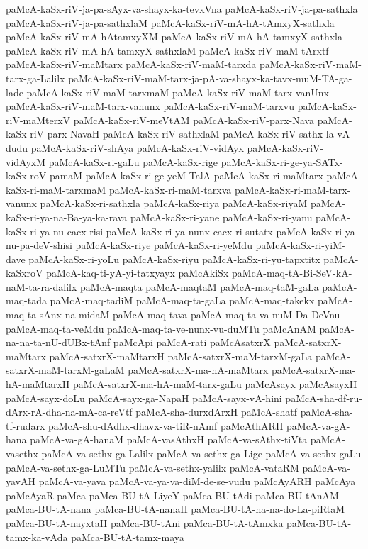 {paMcA-kaSx-riV-ja-pa-sAyx-va-shayx-ka-tevxVna
paMcA-kaSx-riV-ja-pa-sathxla
paMcA-kaSx-riV-ja-pa-sathxlaM
paMcA-kaSx-riV-mA-hA-tAmxyX-sathxla
paMcA-kaSx-riV-mA-hAtamxyXM
paMcA-kaSx-riV-mA-hA-tamxyX-sathxla
paMcA-kaSx-riV-mA-hA-tamxyX-sathxlaM
paMcA-kaSx-riV-maM-tArxtf
paMcA-kaSx-riV-maMtarx
paMcA-kaSx-riV-maM-tarxda
paMcA-kaSx-riV-maM-tarx-ga-Lalilx
paMcA-kaSx-riV-maM-tarx-ja-pA-va-shayx-ka-tavx-muM-TA-ga-lade
paMcA-kaSx-riV-maM-tarxmaM
paMcA-kaSx-riV-maM-tarx-vanUnx
paMcA-kaSx-riV-maM-tarx-vanunx
paMcA-kaSx-riV-maM-tarxvu
paMcA-kaSx-riV-maMterxV
paMcA-kaSx-riV-meVtAM
paMcA-kaSx-riV-parx-Nava
paMcA-kaSx-riV-parx-NavaH
paMcA-kaSx-riV-sathxlaM
paMcA-kaSx-riV-sathx-la-vA-dudu
paMcA-kaSx-riV-shAya
paMcA-kaSx-riV-vidAyx
paMcA-kaSx-riV-vidAyxM
paMcA-kaSx-ri-gaLu
paMcA-kaSx-rige
paMcA-kaSx-ri-ge-ya-SATx-kaSx-roV-pamaM
paMcA-kaSx-ri-ge-yeM-TalA
paMcA-kaSx-ri-maMtarx
paMcA-kaSx-ri-maM-tarxmaM
paMcA-kaSx-ri-maM-tarxva
paMcA-kaSx-ri-maM-tarx-vanunx
paMcA-kaSx-ri-sathxla
paMcA-kaSx-riya
paMcA-kaSx-riyaM
paMcA-kaSx-ri-ya-na-Ba-ya-ka-rava
paMcA-kaSx-ri-yane
paMcA-kaSx-ri-yanu
paMcA-kaSx-ri-ya-nu-cacx-risi
paMcA-kaSx-ri-ya-nunx-cacx-ri-sutatx
paMcA-kaSx-ri-ya-nu-pa-deV-shisi
paMcA-kaSx-riye
paMcA-kaSx-ri-yeMdu
paMcA-kaSx-ri-yiM-dave
paMcA-kaSx-ri-yoLu
paMcA-kaSx-riyu
paMcA-kaSx-ri-yu-tapxtitx
paMcA-kaSxroV
paMcA-kaq-ti-yA-yi-tatxyayx
paMcAkiSx
paMcA-maq-tA-Bi-SeV-kA-naM-ta-ra-dalilx
paMcA-maqta
paMcA-maqtaM
paMcA-maq-taM-gaLa
paMcA-maq-tada
paMcA-maq-tadiM
paMcA-maq-ta-gaLa
paMcA-maq-takekx
paMcA-maq-ta-sAnx-na-midaM
paMcA-maq-tava
paMcA-maq-ta-va-nuM-Da-DeVnu
paMcA-maq-ta-veMdu
paMcA-maq-ta-ve-nunx-vu-duMTu
paMcAnAM
paMcA-na-na-ta-nU-dUBx-tAnf
paMcApi
paMcA-rati
paMcAsatxrX
paMcA-satxrX-maMtarx
paMcA-satxrX-maMtarxH
paMcA-satxrX-maM-tarxM-gaLa
paMcA-satxrX-maM-tarxM-gaLaM
paMcA-satxrX-ma-hA-maMtarx
paMcA-satxrX-ma-hA-maMtarxH
paMcA-satxrX-ma-hA-maM-tarx-gaLu
paMcAsayx
paMcAsayxH
paMcA-sayx-doLu
paMcA-sayx-ga-NapaH
paMcA-sayx-vA-hini
paMcA-sha-df-ru-dArx-rA-dha-na-mA-ca-reVtf
paMcA-sha-durxdArxH
paMcA-shatf
paMcA-sha-tf-rudarx
paMcA-shu-dAdhx-dhavx-va-tiR-nAmf
paMcAthARH
paMcA-va-gA-hana
paMcA-va-gA-hanaM
paMcA-vasAthxH
paMcA-va-sAthx-tiVta
paMcA-vasethx
paMcA-va-sethx-ga-Lalilx
paMcA-va-sethx-ga-Lige
paMcA-va-sethx-gaLu
paMcA-va-sethx-ga-LuMTu
paMcA-va-sethx-yalilx
paMcA-vataRM
paMcA-va-yavAH
paMcA-va-yava
paMcA-va-ya-va-diM-de-se-vudu
paMcAyARH
paMcAya
paMcAyaR
paMca
paMca-BU-tA-LiyeY
paMca-BU-tAdi
paMca-BU-tAnAM
paMca-BU-tA-nana
paMca-BU-tA-nanaH
paMca-BU-tA-na-na-do-La-piRtaM
paMca-BU-tA-nayxtaH
paMca-BU-tAni
paMca-BU-tA-tAmxka
paMca-BU-tA-tamx-ka-vAda
paMca-BU-tA-tamx-maya
}
